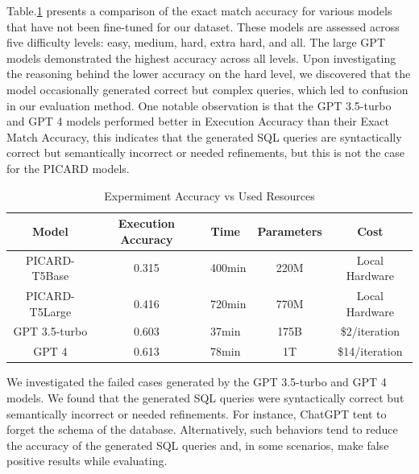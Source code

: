 Table.\ref{tab:exp-acc-vs-resources} presents a comparison of the exact match accuracy for various models that have not been fine-tuned for our dataset. These models are assessed across five difficulty levels: easy, medium, hard, extra hard, and all. The large GPT models demonstrated the highest accuracy across all levels. Upon investigating the reasoning behind the lower accuracy on the hard level, we discovered that the model occasionally generated correct but complex queries, which led to confusion in our evaluation method. One notable observation is that the GPT 3.5-turbo and GPT 4 models performed better in Execution Accuracy than their Exact Match Accuracy, this indicates that the generated SQL queries are syntactically correct but semantically incorrect or needed refinements, but this is not the case for the PICARD models.

\begin{table}[!ht]
    \centering
    \begin{tabular}{ccccc}
        \hline
        Model          & \textbf{Execution Accuracy} & \textbf{Time} & \textbf{Parameters} & \textbf{Cost}  \\ \hline
        PICARD-T5Base  & 0.315                       & ~400min       & 220M                & Local Hardware \\ \hline
        PICARD-T5Large & 0.416                       & ~720min       & 770M                & Local Hardware \\ \hline
        GPT 3.5-turbo  & 0.603                       & 37min         & 175B                & \$2/iteration  \\ \hline
        GPT 4          & 0.613                       & 78min         & 1T                  & \$14/iteration \\ \hline
    \end{tabular}
    \caption{Expermiment Accuracy vs Used Resources}
    \label{tab:exp-acc-vs-resources}
\end{table}

We investigated the failed cases generated by the GPT 3.5-turbo and GPT 4 models. We found that the generated SQL queries were syntactically correct but semantically incorrect or needed refinements. For instance, ChatGPT tent to forget the schema of the database. Alternatively, such behaviors tend to reduce the accuracy of the generated SQL queries and, in some scenarios, make false positive results while evaluating.


